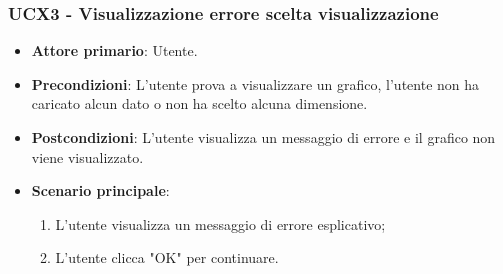 \subsubsection{UCX3 - Visualizzazione errore scelta visualizzazione}
\begin{itemize}
	\item \textbf{Attore primario}: Utente.
	\item \textbf{Precondizioni}: L'utente prova a visualizzare un grafico, l'utente non ha caricato alcun dato o non ha scelto alcuna dimensione.
	\item \textbf{Postcondizioni}: L'utente visualizza un messaggio di errore e il grafico non viene visualizzato.
	\item \textbf{Scenario principale}:
		\begin{enumerate}
			\item L'utente visualizza un messaggio di errore esplicativo;
			\item L'utente clicca "OK" per continuare.
		\end{enumerate}
\end{itemize}